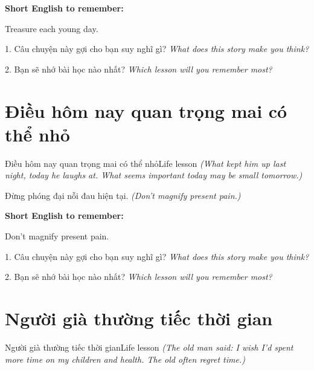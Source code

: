 \begin{ghinhoanh}
\textbf{Short English to remember:}

Treasure each young day.

\end{ghinhoanh}

\begin{tuhocnhanh}
1. Câu chuyện này gợi cho bạn suy nghĩ gì? \textit{What does this story make you think?}

2. Bạn sẽ nhớ bài học nào nhất? \textit{Which lesson will you remember most?}
\end{tuhocnhanh}
\ngancach


\section{Điều hôm nay quan trọng mai có thể nhỏ}
\begin{truyen}{Điều hôm nay quan trọng mai có thể nhỏ}{Life lesson}
\textit{(What kept him up last night, today he laughs at. What seems important today may be small tomorrow.)}
\end{truyen}

\begin{baihoc}
Đừng phóng đại nỗi đau hiện tại.
\textit{(Don't magnify present pain.)}
\end{baihoc}

\begin{ghinhoanh}
\textbf{Short English to remember:}

Don't magnify present pain.

\end{ghinhoanh}

\begin{tuhocnhanh}
1. Câu chuyện này gợi cho bạn suy nghĩ gì? \textit{What does this story make you think?}

2. Bạn sẽ nhớ bài học nào nhất? \textit{Which lesson will you remember most?}
\end{tuhocnhanh}
\ngancach


\section{Người già thường tiếc thời gian}
\begin{truyen}{Người già thường tiếc thời gian}{Life lesson}
\textit{(The old man said: I wish I'd spent more time on my children and health. The old often regret time.)}
\end{truyen}


